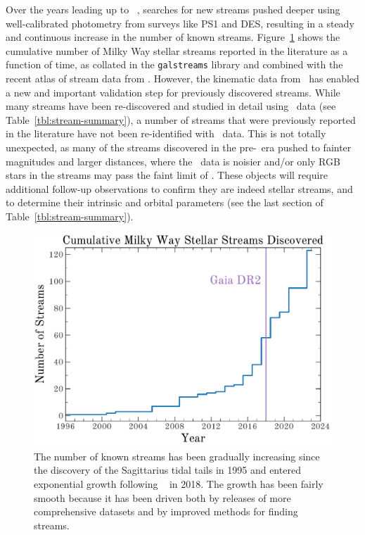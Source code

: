 \documentclass[final,5p,times,twocolumn,authoryear]{elsarticle}
\begin{document}
Over the years leading up to \gaia\ , searches for new streams pushed deeper using
well-calibrated photometry from surveys like PS1 and DES, resulting in a steady and
continuous increase in the number of known streams.
Figure~\ref{fig:num-streams} shows the cumulative number of Milky Way stellar streams
reported in the literature as a function of time, as collated in the \texttt{galstreams}
\citep{mateu:2023} library and combined with the recent atlas of stream data from
\citet{ibata:2023}.
However, the kinematic data from \gaia\ has enabled a new and important validation step
for previously discovered streams.
While many streams have been re-discovered and studied in detail using \gaia\ data (see
Table~\ref{tbl:stream-summary}), a number of streams that were previously reported in
the literature have not been re-identified with \gaia\ data.
This is not totally unexpected, as many of the streams discovered in the pre-\gaia\ era
pushed to fainter magnitudes and larger distances, where the \gaia\ data is noisier
and/or only RGB stars in the streams may pass the faint limit of \gaia.
These objects will require additional follow-up observations to confirm they are indeed stellar streams, and to
determine their intrinsic and orbital parameters (see the last section of
Table~\ref{tbl:stream-summary}).

\begin{figure}[t!]
\begin{center}
\includegraphics[width=\columnwidth]{cumulative-num-streams.pdf}
\end{center}
\caption{%
The number of known streams has been gradually increasing since the discovery of the Sagittarius tidal tails in 1995 and entered exponential growth following \gaia\  in 2018.
The growth has been fairly smooth because it has been driven both by releases of more comprehensive datasets and by improved methods for finding streams.
}
\label{fig:num-streams}
\end{figure}
\end{document}
